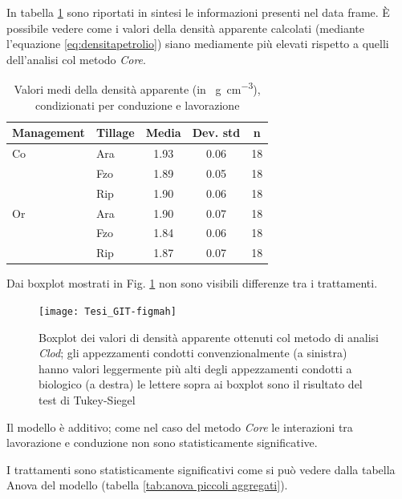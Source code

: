 \documentclass[11pt, a4paper, openright, titlepage, final, language = italian]{book}
\begin{document}
In tabella \ref{tab:summary petrolio} sono riportati in sintesi
le informazioni presenti nel data frame. \`E possibile vedere come i
valori della densit\`a apparente calcolati (mediante l'equazione
\ref{eq:densitapetrolio}) siano mediamente pi\`u elevati rispetto a
quelli dell'analisi col metodo \emph{Core}.

\begin{table}[ht]
\centering
\caption{Valori medi della densit\`a apparente (in 
                \SI{}{\gram\per\cubic\centi\metre}), 
                condizionati per conduzione e lavorazione } 
\label{tab:summary petrolio}
\begin{tabular}{llccc}
  \hline
Management & Tillage & Media & Dev. std & n \\ 
  \hline
Co & Ara & 1.93 & 0.06 &  18 \\ 
   & Fzo & 1.89 & 0.05 &  18 \\ 
   & Rip & 1.90 & 0.06 &  18 \\ 
  Or & Ara & 1.90 & 0.07 &  18 \\ 
   & Fzo & 1.84 & 0.06 &  18 \\ 
   & Rip & 1.87 & 0.07 &  18 \\ 
   \hline
\end{tabular}
\end{table}


Dai boxplot mostrati in Fig. \ref{fig:boxplotpetrolio} non sono visibili
differenze tra i trattamenti.


\begin{figure}[ht]
  \centering 
\texttt{[image: Tesi\_GIT-figmah]}
\caption{Boxplot dei valori di densit\`a apparente ottenuti col metodo
  di analisi \emph{Clod}; gli appezzamenti condotti convenzionalmente
  (a sinistra) hanno valori leggermente più alti degli appezzamenti
  condotti a biologico (a destra) le lettere sopra ai boxplot sono il
  risultato del test di Tukey-Siegel }
  \label{fig:boxplotpetrolio}

\end{figure}

Il modello \`e additivo; come nel caso del metodo \emph{Core} le
interazioni tra lavorazione e conduzione non sono statisticamente
significative.

I trattamenti sono statisticamente significativi come si pu\`o vedere
dalla tabella Anova del modello (tabella \ref{tab:anova piccoli aggregati}).
\end{document}
